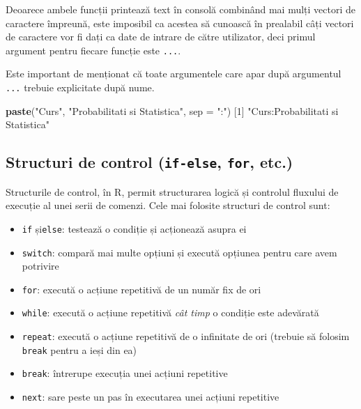 \documentclass[]{article}
\newenvironment{Shaded}{\begin{snugshade}}{\end{snugshade}}
\newcommand{\KeywordTok}[1]{\textcolor[rgb]{0.13,0.29,0.53}{\textbf{#1}}}
\newcommand{\DataTypeTok}[1]{\textcolor[rgb]{0.13,0.29,0.53}{#1}}
\newcommand{\DecValTok}[1]{\textcolor[rgb]{0.00,0.00,0.81}{#1}}
\newcommand{\StringTok}[1]{\textcolor[rgb]{0.31,0.60,0.02}{#1}}
\newcommand{\NormalTok}[1]{#1}
\begin{document}
Deoarece ambele funcții printează text în consolă combinând mai mulți
vectori de caractere împreună, este imposibil ca acestea să cunoască în
prealabil câți vectori de caractere vor fi dați ca date de intrare de
către utilizator, deci primul argument pentru fiecare funcție este
\texttt{...}.

Este important de menționat că toate argumentele care apar după
argumentul \texttt{...} trebuie explicitate după nume.

\begin{Shaded}
\begin{Highlighting}[]
\KeywordTok{paste}\NormalTok{(}\StringTok{"Curs"}\NormalTok{, }\StringTok{"Probabilitati si Statistica"}\NormalTok{, }\DataTypeTok{sep =} \StringTok{":"}\NormalTok{)}
\NormalTok{[}\DecValTok{1}\NormalTok{] }\StringTok{"Curs:Probabilitati si Statistica"}
\end{Highlighting}
\end{Shaded}

\subsection{\texorpdfstring{Structuri de control (\texttt{if-else},
\texttt{for},
etc.)}{Structuri de control (if-else, for, etc.)}}\label{structuri-de-control-if-else-for-etc.}

Structurile de control, în R, permit structurarea logică și controlul
fluxului de execuție al unei serii de comenzi. Cele mai folosite
structuri de control sunt:

\begin{itemize}
\item
  \texttt{if} și\texttt{else}: testează o condiție și acționează asupra
  ei
\item
  \texttt{switch}: compară mai multe opțiuni și execută opțiunea pentru
  care avem potrivire
\item
  \texttt{for}: execută o acțiune repetitivă de un număr fix de ori
\item
  \texttt{while}: execută o acțiune repetitivă \emph{cât timp} o
  condiție este adevărată
\item
  \texttt{repeat}: execută o acțiune repetitivă de o infinitate de ori
  (trebuie să folosim \texttt{break} pentru a ieși din ea)
\item
  \texttt{break}: întrerupe execuția unei acțiuni repetitive
\item
  \texttt{next}: sare peste un pas în executarea unei acțiuni repetitive
\end{itemize}
\end{document}
